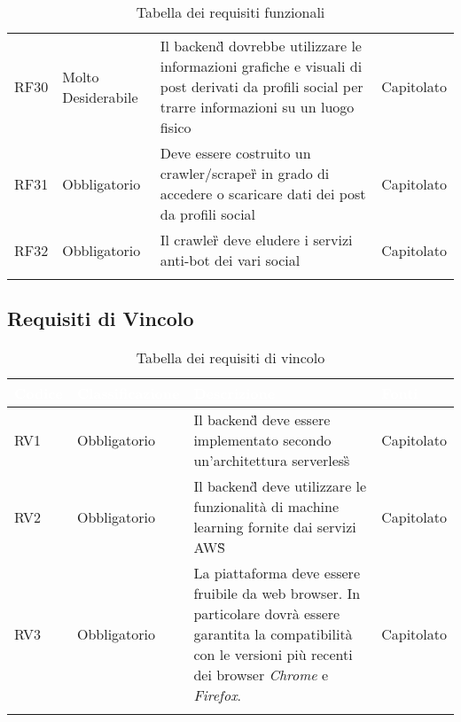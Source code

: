 {\begin{longtable}{C{.15\freewidth} C{.2\freewidth} C{.528\freewidth} C{.15\freewidth}}
      RF30 & Molto Desiderabile & Il backend\G{} dovrebbe utilizzare le informazioni grafiche e visuali di post derivati da profili social per trarre informazioni su un luogo fisico & Capitolato \\
      RF31 & Obbligatorio & Deve essere costruito un crawler/scraper\G{} in grado di accedere o scaricare dati dei post da profili social & Capitolato \\
      RF32 & Obbligatorio & Il crawler\G{} deve eludere i servizi anti-bot dei vari social & Capitolato \\
      \bottomrule
      \caption{Tabella dei requisiti funzionali}
      \end{longtable}
}
\subsection{Requisiti di Vincolo}
{
      \setlength{\freewidth}{\dimexpr\textwidth-10\tabcolsep}
      \renewcommand{\arraystretch}{1.5}
      \centering
      \setlength{\aboverulesep}{0pt}
      \setlength{\belowrulesep}{0pt}
      \begin{longtable}{C{.15\freewidth} C{.2\freewidth} C{.528\freewidth} C{.15\freewidth}}
         \toprule
      \textcolor{white}{\textbf{Codice}}&
      \textcolor{white}{\textbf{Classificazione}}&
      \textcolor{white}{\textbf{Descrizione}}&
      \textcolor{white}{\textbf{Fonti}}\\	
      \toprule
      \endhead
      RV1 & Obbligatorio & Il backend\G{} deve essere implementato secondo un'architettura serverless\G{} & Capitolato \\
      RV2 & Obbligatorio & Il backend\G{} deve utilizzare le funzionalità di machine learning fornite dai servizi AWS\G{} & Capitolato \\
      RV3 & Obbligatorio & La piattaforma deve essere fruibile da web browser. In particolare dovrà essere garantita la compatibilità con le versioni più recenti dei browser \textit{Chrome} e \textit{Firefox}. & Capitolato \\
      \bottomrule
      \caption{Tabella dei requisiti di vincolo}
      \end{longtable}
}
